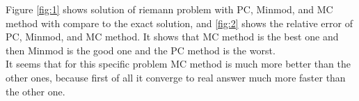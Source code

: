 \documentclass[10pt]{article}
\begin{document}
Figure \ref{fig:1} shows solution of riemann problem with PC, Minmod, and MC method with compare to the exact solution, and \ref{fig:2} shows the relative error of PC, Minmod, and MC method. It shows that MC method is the best one and then Minmod is the good one and the PC method is the worst. \\

It seems that for this specific problem MC method is much more better than the other ones, because first of all it converge to real answer much more faster than the other one. \\ 

\pagebreak
\end{document}
